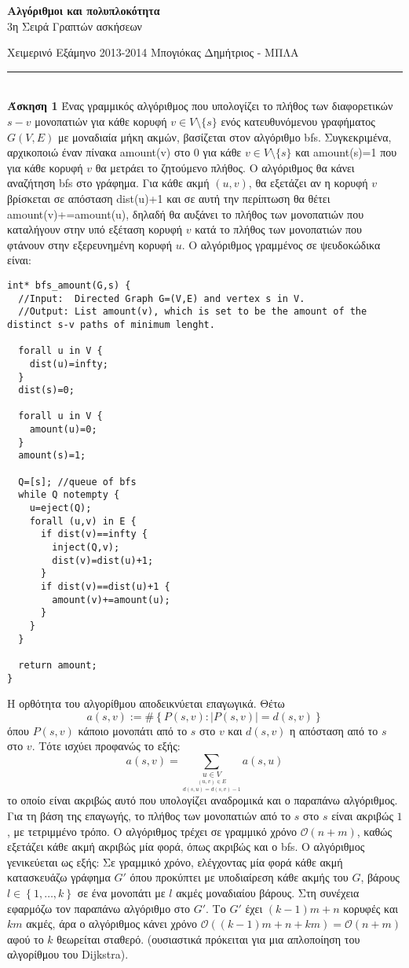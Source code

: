\documentclass[12pt]{article}
\newcommand\en[1]{\latintext #1\greektext}
\newcommand\bigOh{\mathcal{O}}
\newcommand{\HRule}{\rule{\linewidth}{0.1mm}}
\begin{document}
\begin{center}
{\bf Αλγόριθμοι και πολυπλοκότητα}\\
3η Σειρά Γραπτών ασκήσεων
\end{center}
Χειμερινό Εξάμηνο 2013-2014 \hfill Μπογιόκας Δημήτριος - ΜΠΛΑ
\HRule\\
{\bf Άσκηση 1} Ένας γραμμικός αλγόριθμος που υπολογίζει το πλήθος των διαφορετικών $s-v$ μονοπατιών για κάθε κορυφή $v\in V\setminus\{s\}$ ενός κατευθυνόμενου γραφήματος $G(V,E)$ με μοναδιαία μήκη ακμών, βασίζεται στον αλγόριθμο \en{bfs}. Συγκεκριμένα, αρχικοποιώ έναν πίνακα \en{amount(v)} στο 0 για κάθε $v\in V\setminus\{s\}$ και \en{amount(s)=1} που για κάθε κορυφή $v$ θα μετράει το ζητούμενο πλήθος. Ο αλγόριθμος θα κάνει αναζήτηση \en{bfs} στο γράφημα. Για κάθε ακμή $(u,v)$, θα εξετάζει αν η κορυφή $v$ βρίσκεται σε απόσταση \en{dist(u)+1} και σε αυτή την περίπτωση θα θέτει \en{amount(v)+=amount(u)}, δηλαδή θα αυξάνει το πλήθος των μονοπατιών που καταλήγουν στην υπό εξέταση κορυφή $v$ κατά το πλήθος των μονοπατιών που φτάνουν στην εξερευνημένη κορυφή $u$. Ο αλγόριθμος γραμμένος σε ψευδοκώδικα είναι:
\latintext\begin{lstlisting}
int* bfs_amount(G,s) {
  //Input:  Directed Graph G=(V,E) and vertex s in V.
  //Output: List amount(v), which is set to be the amount of the distinct s-v paths of minimum lenght.

  forall u in V {
    dist(u)=infty;
  }
  dist(s)=0;

  forall u in V {
    amount(u)=0;
  }
  amount(s)=1;

  Q=[s]; //queue of bfs
  while Q notempty {
    u=eject(Q);
    forall (u,v) in E {
      if dist(v)==infty {
        inject(Q,v);
        dist(v)=dist(u)+1;
      }
      if dist(v)==dist(u)+1 {
        amount(v)+=amount(u);
      }
    }
  }

  return amount;
}
\end{lstlisting}\greektext
Η ορθότητα του αλγορίθμου αποδεικνύεται επαγωγικά. Θέτω
$$a\left(s,v\right):=\#\left\{P\left(s,v\right):|P\left(s,v\right)|=d\left(s,v\right)\right\}$$
όπου $P\left(s,v\right)$ κάποιο μονοπάτι από το $s$ στο $v$ και $d\left(s,v\right)$ η απόσταση από το $s$ στο $v$.
Τότε ισχύει προφανώς το εξής:
$$a\left(s,v\right)=\sum_{\underset{d\left(s,u\right)=d\left(s,v\right)-1}{\underset{(u,v)\in E}{u\in V}}}a\left(s,u\right)$$
το οποίο είναι ακριβώς αυτό που υπολογίζει αναδρομικά και ο παραπάνω αλγόριθμος. Για τη βάση της επαγωγής, το πλήθος των μονοπατιών από το $s$ στο $s$ είναι ακριβώς $1$, με τετριμμένο τρόπο. Ο αλγόριθμος τρέχει σε γραμμικό χρόνο $\bigOh(n+m)$, καθώς εξετάζει κάθε ακμή ακριβώς μία φορά, όπως ακριβώς και ο \en{bfs}. Ο αλγόριθμος γενικεύεται ως εξής: Σε γραμμικό χρόνο, ελέγχοντας μία φορά κάθε ακμή κατασκευάζω γράφημα $G'$ όπου προκύπτει με υποδιαίρεση κάθε ακμής του $G$, βάρους $l\in\left\{1,\ldots,k\right\}$ σε ένα μονοπάτι με $l$ ακμές μοναδιαίου βάρους. Στη συνέχεια εφαρμόζω τον παραπάνω αλγόριθμο στο $G'$. Το $G'$ έχει $(k-1)m+n$ κορυφές και $km$ ακμές, άρα ο αλγόριθμος κάνει χρόνο $\bigOh((k-1)m+n+km)=\bigOh(n+m)$ αφού το $k$ θεωρείται σταθερό. (ουσιαστικά πρόκειται για μια απλοποίηση του αλγορίθμου του \en{Dijkstra}).\\
\end{document}
